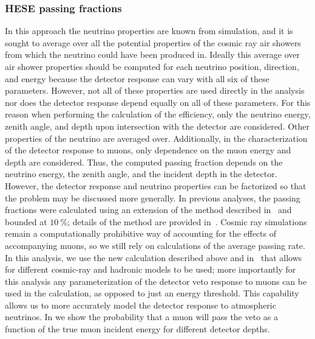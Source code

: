 \subsubsection{HESE passing fractions\label{sec:hese_passingfractions}}
In this approach the neutrino properties are known from simulation, and it is sought to average over all the potential properties of the cosmic ray air showers from which the neutrino could have been produced in.
Ideally this average over air shower properties should be computed for each neutrino position, direction, and energy because the detector response can vary with all six of these parameters.
However, not all of these properties are used directly in the analysis nor does the detector response depend equally on all of these parameters.
For this reason when performing the calculation of the efficiency, only the neutrino energy, zenith angle, and depth upon intersection with the detector are considered.
Other properties of the neutrino are averaged over.
Additionally, in the characterization of the detector response to muons, only dependence on the muon energy and depth are considered.
Thus, the computed passing fraction depends on the neutrino energy, the zenith angle, and the incident depth in the detector.
However, the detector response and neutrino properties can be factorized so that the problem may be discussed more generally.
In previous analyses, the passing fractions were calculated using an extension of the method described in~\cite{Schonert:2008is} and bounded at $\SI{10}\percent$; details of the method are provided in~\cite{Aartsen:2013jdh}.
Cosmic ray simulations remain a computationally prohibitive way of accounting for the effects of accompanying muons, so we still rely on calculations of the average passing rate.
In this analysis, we use the new calculation described above and in~\cite{Arguelles:2018awr} that allows for different cosmic-ray and hadronic models to be used; more importantly for this analysis any parameterization of the detector veto response to muons can be used in the calculation, as opposed to just an energy threshold.
This capability allows us to more accurately model the detector response to atmospheric neutrinos.
In  we show the probability that a muon will pass the veto as a function of the true muon incident energy for different detector depths.

